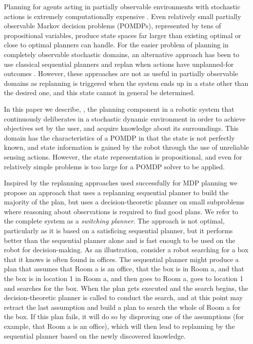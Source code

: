 Planning for agents acting in partially observable environments with
stochastic actions is extremely computationally
expensive \cite{mdp-complexity}. Even relatively small partially
observable Markov decision problems (POMDPs), represented by tens of
propositional variables, produce state spaces far larger than existing
optimal or close to optimal planners can handle. For the easier
problem of planning in completely observable stochastic domains, an
alternative approach has been to use classical sequential planners and
replan when actions have unplanned-for
outcomes \cite{yoon:etal:2007}. However, these approaches are not as
useful in partially observable domains as replanning is triggered when
the system ends up in a state other than the desired one, and this
state cannot in general be determined.

In this paper we describe, \pcogx, the planning component in a robotic
system that continuously deliberates in a stochastic dynamic
environment in order to achieve objectives set by the user, and
acquire knowledge about its surroundings. This domain has the
characteristics of a POMDP in that the state is not perfectly known,
and state information is gained by the robot through the use of
unreliable sensing actions. However, the state representation is
propositional, and even for relatively simple problems is too large
for a POMDP solver to be applied.

Inspired by the replanning approaches used successfully for MDP
planning \cite{yoon:etal:2007,yoon:etal:2008} we propose an approach
that uses a replanning sequential planner to build the majority of the
plan, but uses a decision-theoretic planner on small subproblems where
reasoning about observations is required to find good plans. We refer
to the complete system as a {\em switching planner}. The approach is
not optimal, particularly as it is based on a satisficing sequential
planner, but it performs better than the sequential planner alone and
is fast enough to be used on the robot for decision-making. As an
illustration, consider a robot searching for a box that it knows is
often found in offices. The sequential planner might produce a plan
that assumes that {\sc Room a} is an office, that the box is in {\sc
Room a}, and that the box is in location 1 in {\sc Room a}, and then
goes to {\sc Room a}, goes to location 1 and searches for the
box. When the plan gets executed and the search begins, the
decision-theoretic planner is called to conduct the search, and at
this point may retract the last assumption and build a plan to search
the whole of {\sc Room a} for the box. If this plan fails, it will do
so by disproving one of the assumptions (for example, that {\sc Room
a} is an office), which will then lead to replanning by the sequential
planner based on the newly discovered knowledge.

